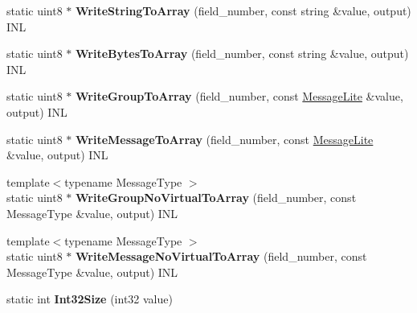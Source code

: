 \begin{DoxyCompactItemize}
static uint8 $\ast$ {\bfseries Write\+String\+To\+Array} (field\+\_\+number, const string \&value, output) I\+NL
\item 
\mbox{\label{classgoogle_1_1protobuf_1_1internal_1_1WireFormatLite_ae21cba6f72439d21f07af6cc8226894b}} 
static uint8 $\ast$ {\bfseries Write\+Bytes\+To\+Array} (field\+\_\+number, const string \&value, output) I\+NL
\item 
\mbox{\label{classgoogle_1_1protobuf_1_1internal_1_1WireFormatLite_a521de3eb58c8c5079f1f863af508043b}} 
static uint8 $\ast$ {\bfseries Write\+Group\+To\+Array} (field\+\_\+number, const \hyperlink{classgoogle_1_1protobuf_1_1MessageLite}{Message\+Lite} \&value, output) I\+NL
\item 
\mbox{\label{classgoogle_1_1protobuf_1_1internal_1_1WireFormatLite_a0ab726057747951f25f2649b45109614}} 
static uint8 $\ast$ {\bfseries Write\+Message\+To\+Array} (field\+\_\+number, const \hyperlink{classgoogle_1_1protobuf_1_1MessageLite}{Message\+Lite} \&value, output) I\+NL
\item 
\mbox{\label{classgoogle_1_1protobuf_1_1internal_1_1WireFormatLite_ad20f8e1badac0efeea423aacd01e6403}} 
{\footnotesize template$<$typename Message\+Type $>$ }\\static uint8 $\ast$ {\bfseries Write\+Group\+No\+Virtual\+To\+Array} (field\+\_\+number, const Message\+Type \&value, output) I\+NL
\item 
\mbox{\label{classgoogle_1_1protobuf_1_1internal_1_1WireFormatLite_adb2e10be9f3e6c8ddb58e452a9b5e489}} 
{\footnotesize template$<$typename Message\+Type $>$ }\\static uint8 $\ast$ {\bfseries Write\+Message\+No\+Virtual\+To\+Array} (field\+\_\+number, const Message\+Type \&value, output) I\+NL
\item 
\mbox{\label{classgoogle_1_1protobuf_1_1internal_1_1WireFormatLite_a3c659c04d71372421f8f6e90c79457e4}} 
static int {\bfseries Int32\+Size} (int32 value)
\item 

\end{DoxyCompactItemize}
